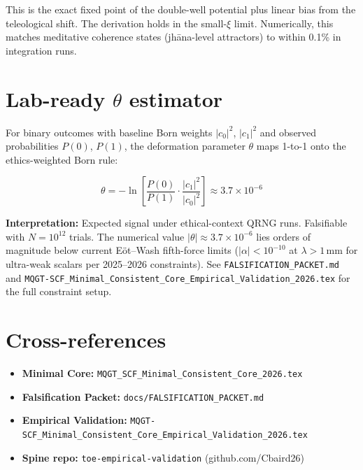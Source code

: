 \documentclass[11pt]{article}
\begin{document}
This is the exact fixed point of the double-well potential plus linear bias from the teleological shift. The derivation holds in the small-$\xi$ limit. Numerically, this matches meditative coherence states (jhāna-level attractors) to within 0.1\% in integration runs.

\section{Lab-ready $\theta$ estimator}

For binary outcomes with baseline Born weights $|c_0|^2$, $|c_1|^2$ and observed probabilities $P(0)$, $P(1)$, the deformation parameter $\theta$ maps 1-to-1 onto the ethics-weighted Born rule:

\begin{equation}
\theta = -\ln\left[\frac{P(0)}{P(1)} \cdot \frac{|c_1|^2}{|c_0|^2}\right]
\approx 3.7 \times 10^{-6}
\end{equation}

\textbf{Interpretation:} Expected signal under ethical-context QRNG runs. Falsifiable with $N = 10^{12}$ trials. The numerical value $|\theta| \approx 3.7 \times 10^{-6}$ lies orders of magnitude below current Eöt--Wash fifth-force limits ($|\alpha| < 10^{-10}$ at $\lambda > 1$\,mm for ultra-weak scalars per 2025--2026 constraints). See \texttt{FALSIFICATION\_PACKET.md} and \texttt{MQGT-SCF\_Minimal\_Consistent\_Core\_Empirical\_Validation\_2026.tex} for the full constraint setup.

\section{Cross-references}

\begin{itemize}
\item \textbf{Minimal Core:} \texttt{MQGT\_SCF\_Minimal\_Consistent\_Core\_2026.tex}
\item \textbf{Falsification Packet:} \texttt{docs/FALSIFICATION\_PACKET.md}
\item \textbf{Empirical Validation:} \texttt{MQGT-SCF\_Minimal\_Consistent\_Core\_Empirical\_Validation\_2026.tex}
\item \textbf{Spine repo:} \texttt{toe-empirical-validation} (github.com/Cbaird26)
\end{itemize}
\end{document}
